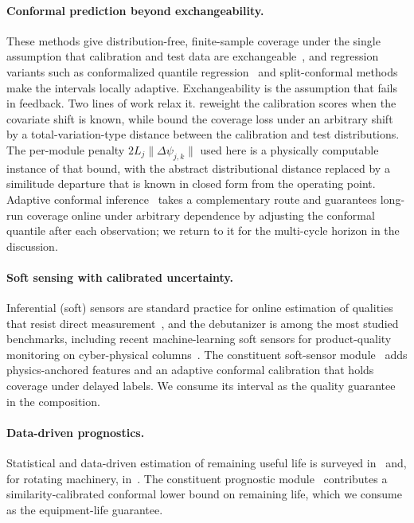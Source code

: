 \documentclass[review,12pt]{elsarticle}
\theoremstyle{definition}
\begin{document}
\paragraph{Conformal prediction beyond exchangeability.}
These methods give distribution-free, finite-sample coverage under the single
assumption that calibration and test data are exchangeable~\citep{vovk2005,shafer2008,
angelopoulos2023}, and regression variants such as conformalized quantile
regression~\citep{romano2019} and split-conformal methods~\citep{lei2018} make the
intervals locally adaptive. Exchangeability is the assumption that fails in feedback.
Two lines of work relax it. \citet{tibshirani2019} reweight the calibration scores when
the covariate shift is known, while \citet{barber2023} bound the coverage loss under an
arbitrary shift by a total-variation-type distance between the calibration and test
distributions. The per-module penalty $2L_j\|\Delta\psi_{j,k}\|$ used here is a
physically computable instance of that bound, with the abstract distributional distance
replaced by a similitude departure that is known in closed form from the operating
point. Adaptive conformal inference~\citep{gibbs2021} takes a complementary route and
guarantees long-run coverage online under arbitrary dependence by adjusting the
conformal quantile after each observation; we return to it for the multi-cycle horizon
in the discussion.

\paragraph{Soft sensing with calibrated uncertainty.}
Inferential (soft) sensors are standard practice for online estimation of qualities
that resist direct measurement~\citep{fortuna2007}, and the debutanizer is among the
most studied benchmarks, including recent machine-learning soft sensors for
product-quality monitoring on cyber-physical columns~\citep{rozanec2022}. The
constituent soft-sensor module~\citep{busico_m1} adds physics-anchored features and an
adaptive conformal calibration that holds coverage under delayed labels. We consume its
interval as the quality guarantee in the composition.

\paragraph{Data-driven prognostics.}
Statistical and data-driven estimation of remaining useful life is surveyed
in~\citet{si2011} and, for rotating machinery, in~\citet{lei2018machinery}. The
constituent prognostic module~\citep{busico_m2} contributes a similarity-calibrated
conformal lower bound on remaining life, which we consume as the equipment-life
guarantee.
\end{document}
